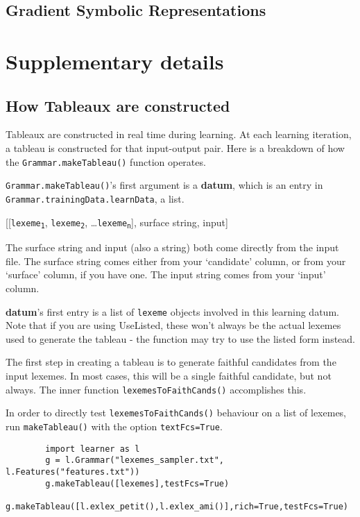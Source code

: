 \documentclass[12]{article}
\begin{document}
	\subsection{Gradient Symbolic Representations}


\section{Supplementary details}
	\subsection{How Tableaux are constructed}
	Tableaux are constructed in real time during learning. At each learning iteration, a tableau is constructed for that input-output pair.  Here is a breakdown of how the \texttt{Grammar.makeTableau()} function operates.
	
	\texttt{Grammar.makeTableau()}'s first argument is a {\bf datum}, which is an entry in \texttt{Grammar.trainingData.learnData}, a list.
	
	\begin{exe}
		  [[\texttt{lexeme\textsubscript{1}}, \texttt{lexeme\textsubscript{2}}, \ldots \texttt{lexeme\textsubscript{n}}], surface string, input]
	\end{exe}

	The surface string and input (also a string) both come directly from the input file.  The surface string comes either from your `candidate' column, or from your `surface' column, if you have one.  The input string comes from your `input' column.
	
	{\bf datum}'s first entry is a list of \texttt{lexeme} objects involved in this learning datum.  Note that if you are using UseListed, these won't always be the actual lexemes used to generate the tableau - the function may try to use the listed form instead.
	
	The first step in creating a tableau is to generate faithful candidates from the input lexemes.  In most cases, this will be a single faithful candidate, but not always.  The inner function \texttt{lexemesToFaithCands()} accomplishes this.
	
	In order to directly test \texttt{lexemesToFaithCands()} behaviour on a list of lexemes, run \texttt{makeTableau()} with the option \texttt{textFcs=True}.
	
	\begin{verbatim}
		import learner as l
		g = l.Grammar("lexemes_sampler.txt", l.Features("features.txt"))
		g.makeTableau([lexemes],testFcs=True)
		g.makeTableau([l.exlex_petit(),l.exlex_ami()],rich=True,testFcs=True)
	\end{verbatim}
	
\end{document}
